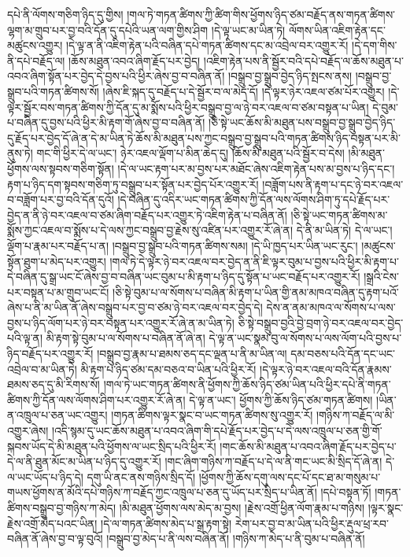 དཔེ་ནི་ལོགས་གཅིག་ཉིད་དུ་གྱིས། །གལ་ཏེ་གཏན་ཚིགས་ཀྱི་ཚིག་གིས་ཕྱོགས་ཉིད་ཙམ་བརྗོད་ནས་གཏན་ཚིགས་ལྷག་མ་གྲུབ་པར་བྱ་བའི་དོན་དུ་དཔེའི་ཡན་ལག་གྱིས་ཤིག །དེ་ལྟ་ཡང་མ་ཡིན་ཏེ། ལོགས་ཡིན་འཇིག་རྟེན་དང་མཚུངས་འགྱུར། །དེ་ལྟ་ན་ནི་འཇིག་རྟེན་པའི་བཞིན་དཔེ་གཏན་ཚིགས་དང་མ་འབྲེལ་བར་འགྱུར་རོ། །དེ་དག་གིས་ནི་དཔེ་བརྗོད་ལ། །ཆོས་མཐུན་འབའ་ཞིག་རྗོད་པར་བྱེད། །འཇིག་རྟེན་པས་ནི་སྦྱོར་བའི་དཔེ་བརྗོད་ལ་ཆོས་མཐུན་པ་འབའ་ཞིག་སྟོན་པར་བྱེད་དེ་བྱས་པའི་ཕྱིར་ཞེས་བྱ་བ་བཞིན་ནོ། །བསྒྲུབ་བྱ་སྒྲུབ་བྱེད་ཉིད་སྤངས་ནས། །བསྒྲུབ་བྱ་སྒྲུབ་པའི་གཏན་ཚིགས་སོ། །ཞེས་ཇི་སྐད་དུ་བརྗོད་པ་དེ་སྦྱོར་བ་ལ་མེད་དོ། །དེ་ལྟར་ཉེར་འཇལ་ཙམ་པོར་འགྱུར། །དེ་ལྟར་སྦྱོར་བས་གཏན་ཚིགས་ཀྱི་དོན་དུ་མ་སྨོས་པའི་ཕྱིར་བསྒྲུབ་བྱ་ལ་ཉེ་བར་འཇལ་བ་ཙམ་བསྟན་པ་ཡིན། དེ་བུམ་པ་བཞིན་དུ་བྱས་པའི་ཕྱིར་མི་རྟག་གོ་ཞེས་བྱ་བ་བཞིན་ནོ། །ཅི་སྟེ་ཡང་ཆོས་མི་མཐུན་པས་བསྒྲུབ་བྱ་སྒྲུབ་བྱེད་ཉིད་དུ་རྗོད་པར་བྱེད་དོ་ཞེ་ན་དེ་མ་ཡིན་ཏེ་ཆོས་མི་མཐུན་པས་ཀྱང་བསྒྲུབ་བྱ་སྒྲུབ་པའི་གཏན་ཚིགས་ཉིད་བསྟན་པར་མི་ནུས་ཏེ། གང་གི་ཕྱིར་དེ་ལ་ཡང་། ཉེར་འཇལ་ལྡོག་པ་མིན་ཆེད་དུ། །ཆོས་མི་མཐུན་པའི་སྦྱོར་བ་དེས། །མི་མཐུན་ཕྱོགས་ལས་སྟབས་གཅིག་སྟོན། །དེ་ལ་ཡང་རྟག་པར་མ་བྱས་པར་མཐོང་ཞེས་འཇིག་རྟེན་པས་མ་བྱས་པ་ཉིད་དང་། རྟག་པ་ཉིད་དག་སྟབས་གཅིག་ཏུ་བསྒྲུབ་པར་སྟོན་པར་བྱེད་པོར་འགྱུར་རོ། །བཟློག་པས་ནི་རྟག་པ་དང་ཉེ་བར་འཇལ་བ་བཟློག་པར་བྱ་བའི་དོན་དུའོ། །དེ་བཞིན་དུ་འདིར་ཡང་གཏན་ཚིགས་ཀྱི་དོན་ལས་ལོགས་ཤིག་ཏུ་དཔེ་རྗོད་པར་བྱེད་ན་ནི་ཉེ་བར་འཇལ་བ་ཙམ་ཞིག་བརྗོད་པར་འགྱུར་ཏེ་འཇིག་རྟེན་པ་བཞིན་ནོ། །ཅི་སྟེ་ཡང་གཏན་ཚིགས་མ་སྨོས་ཀྱང་འཇལ་བ་སྨོས་པ་དེ་ལས་ཀྱང་བསྒྲུབ་བྱ་རྗེས་སུ་འཛིན་པར་འགྱུར་རོ་ཞེ་ན། དེ་ནི་མ་ཡིན་ཏེ། དེ་ལ་ཡང་། ལྡོག་པ་རྣམ་པར་བརྗོད་པ་ན། །བསྒྲུབ་བྱ་སྒྲུབ་པའི་གཏན་ཚིགས་སམ། །དེ་ཡི་ཁྱད་པར་ཡིན་ཡང་རུང་། །མཚུངས་སྟོན་ཐུག་པ་མེད་པར་འགྱུར། །གལ་ཏེ་དེ་ལྟར་ཉེ་བར་འཇལ་བར་བྱེད་ན་ནི་ཇི་ལྟར་བུམ་པ་བྱས་པའི་ཕྱིར་མི་རྟག་པ་དེ་བཞིན་དུ་སྒྲ་ཡང་ངོ་ཞེས་བྱ་བ་བཞིན་ཡང་བུམ་པ་མི་རྟག་པ་ཉིད་དུ་སྟོན་པ་ཡང་བརྗོད་པར་འགྱུར་རོ། །སྒྲའི་ངེས་པར་བསྟན་པ་མ་གྲུབ་ཡང་ངོ། །ཅི་སྟེ་བུམ་པ་ལ་སོགས་པ་བཞིན་མི་རྟག་པ་ཡིན་གྱི་ནམ་མཁའ་བཞིན་དུ་རྟག་པའོ་ཞེས་པ་ནི་མ་ཡིན་ནོ་ཞེས་བསྒྲུབ་པར་བྱ་བ་ཙམ་ཉེ་བར་འཇལ་བར་བྱེད་དེ། དེས་ན་ནམ་མཁའ་ལ་སོགས་པ་ལས་བྱས་པ་ཉིད་ལོག་པར་ཉེ་བར་བསྟན་པར་འགྱུར་རོ་ཞེ་ན་མ་ཡིན་ཏེ། ཅི་སྟེ་བསྒྲུབ་བྱའི་བྱེ་བྲག་ཉེ་བར་འཇལ་བར་བྱེད་པའི་ལྟ་ན། མི་རྟག་སྟེ་བུམ་པ་ལ་སོགས་པ་བཞིན་ནོ་ཞེ་ན། དེ་ལྟ་ན་ཡང་སྣམ་བུ་ལ་སོགས་པ་ལས་ལོག་པའི་བྱས་པ་ཉིད་བརྗོད་པར་འགྱུར་རོ། །བསྒྲུབ་བྱ་རྣམ་པ་ཐམས་ཅད་དང་ལྡན་པ་ནི་མ་ཡིན་ལ། དམ་བཅས་པའི་དོན་དང་ཡང་འབྲེལ་བ་མ་ཡིན་ཏེ། མི་རྟག་པ་ཉིད་ཙམ་དམ་བཅའ་བ་ཡིན་པའི་ཕྱིར་རོ། །དེ་ལྟར་ཉེ་བར་འཇལ་བའི་དོན་རྣམས་ཐམས་ཅད་དུ་མི་རིགས་སོ། །གལ་ཏེ་ཡང་གཏན་ཚིགས་ནི་ཕྱོགས་ཀྱི་ཆོས་ཉིད་ཙམ་ཡིན་པའི་ཕྱིར་དཔེ་ནི་གཏན་ཚིགས་ཀྱི་དོན་ལས་ལོགས་ཤིག་པར་འགྱུར་རོ་ཞེ་ན། དེ་ལྟ་ན་ཡང་། ཕྱོགས་ཀྱི་ཆོས་ཉིད་ཙམ་གཏན་ཚིགས། །ཡིན་ན་འཁྲུལ་པ་ཅན་ཡང་འགྱུར། །གཏན་ཚིགས་ལྟར་སྣང་བ་ཡང་གཏན་ཚིགས་སུ་འགྱུར་རོ། །གཉིས་ཀ་བརྗོད་ལ་མི་འགྱུར་ཞེས། །འདི་སྙམ་དུ་ཡང་ཆོས་མཐུན་པ་འབའ་ཞིག་གི་དཔེ་རྗོད་པར་བྱེད་པ་དེ་ལས་འཁྲུལ་པ་ཅན་གྱི་གོ་སྐབས་ཡོད་དེ་མི་མཐུན་པའི་ཕྱོགས་ལ་ཡང་སྲིད་པའི་ཕྱིར་རོ། །གང་ཆོས་མི་མཐུན་པ་འབའ་ཞིག་རྗོད་པར་བྱེད་པ་དེ་ལ་ནི་ཐུན་མོང་མ་ཡིན་པ་ཉིད་དུ་འགྱུར་རོ། །གང་ཞིག་གཉིས་ཀ་བརྗོད་པ་དེ་ལ་ནི་གང་ཡང་མི་སྲིད་དོ་ཞེ་ན། དེ་ལ་ཡང་ཡོད་པ་ཉིད་དེ། དགུ་ཡི་ནང་ནས་གཉིས་སྲིད་དོ། །ཕྱོགས་ཀྱི་ཆོས་དགུ་ལས་དང་པོ་དང་ཐ་མ་གསུམ་པ་གཡས་ཕྱོགས་ན་མོའི་དཔེ་གཉིས་ཀ་བརྗོད་ཀྱང་འཁྲུལ་པ་ཅན་དུ་ཡོད་པར་སྲིད་པ་ཡིན་ནོ། །དཔེ་བསྟན་ཏོ། །གཏན་ཚིགས་བསྒྲུབ་བྱ་གཉིས་ཀ་མེད། །མི་མཐུན་ཕྱོགས་ལས་མེད་མ་བྱས། །རྗེས་འགྲོ་ཕྱིན་ལོག་རྣམ་པ་གཉིས། །ལྟར་སྣང་རྗེས་འགྲོ་མེད་པའང་ཡིན། །དེ་ལ་གཏན་ཚིགས་མེད་པ་སྒྲ་རྟག་སྟེ། རེག་པར་བྱ་བ་མ་ཡིན་པའི་ཕྱིར་རྡུལ་ཕྲ་རབ་བཞིན་ནོ་ཞེས་བྱ་བ་ལྟ་བུའོ། །བསྒྲུབ་བྱ་མེད་པ་ནི་ལས་བཞིན་ནོ། །གཉིས་ཀ་མེད་པ་ནི་བུམ་པ་བཞིན་ནོ། 